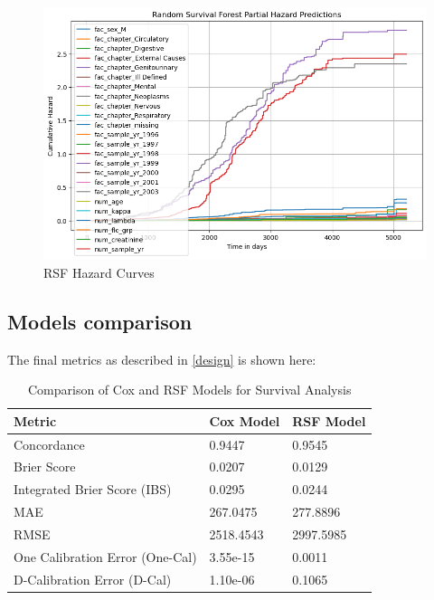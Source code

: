 \begin{figure}[h]
    \centering
    \includegraphics[scale=0.50]{Figures/SURV/rsf_hazard.png}
    \caption{RSF Hazard Curves}
    \label{fig:rsf_haz}
\end{figure}

\clearpage
\subsection{Models comparison} 

The final metrics as described in \ref{design} is shown here:

\begin{table}[h!]
    \centering
    \begin{tabular}{|l|l|l|}
    \hline
    \textbf{Metric}           & \textbf{Cox Model}         & \textbf{RSF Model}        \\ \hline
    Concordance               & 0.9447                     & 0.9545                    \\ \hline
    Brier Score               & 0.0207                     & 0.0129                    \\ \hline
    Integrated Brier Score (IBS) & 0.0295                     & 0.0244                    \\ \hline
    MAE                       & 267.0475                   & 277.8896                  \\ \hline
    RMSE                      & 2518.4543                  & 2997.5985                 \\ \hline
    One Calibration Error (One-Cal) & 3.55e-15                 & 0.0011                    \\ \hline
    D-Calibration Error (D-Cal)  & 1.10e-06                   & 0.1065                    \\ \hline
    \end{tabular}
    \caption{Comparison of Cox and RSF Models for Survival Analysis}
    \label{tab:cox_rsf_comparison}
\end{table}

